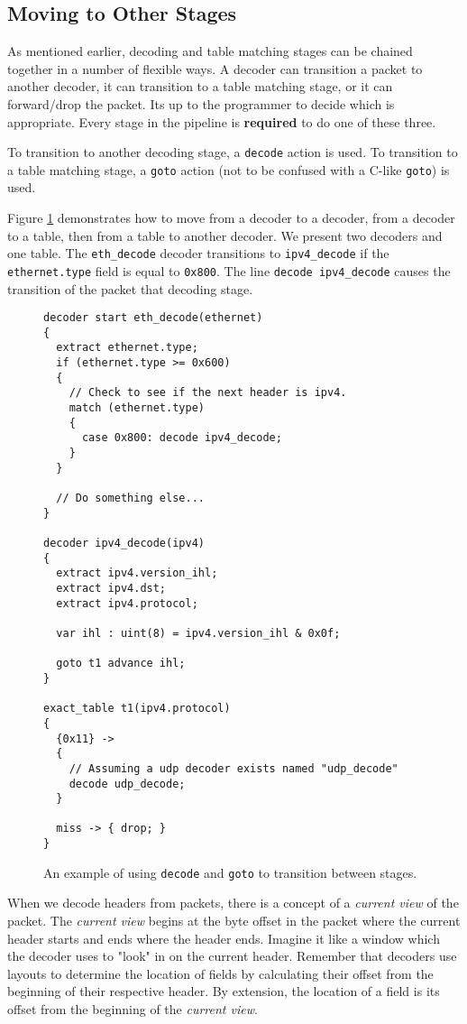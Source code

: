 \subsection{Moving to Other Stages} \label{decoder_next_tut}

As mentioned earlier, decoding and table matching stages can be chained together in a number of flexible ways. A decoder can transition a packet to another decoder, it can transition to a table matching stage, or it can forward/drop the packet. Its up to the programmer to decide which is appropriate. Every stage in the pipeline is \textbf{required} to do one of these three.

To transition to another decoding stage, a \texttt{decode} action is used. To transition to a table matching stage, a \texttt{goto} action (not to be confused with a C-like \texttt{goto}) is used. 

Figure \ref{fg:transition_ex} demonstrates how to move from a decoder to a decoder, from a decoder to a table, then from a table to another decoder. We present two decoders and one table. The \texttt{eth\_decode} decoder transitions to \texttt{ipv4\_decode} if the \texttt{ethernet.type} field is equal to \texttt{0x800}. The line \texttt{decode ipv4\_decode} causes the transition of the packet that decoding stage.

\begin{figure}
\begin{lstlisting}
decoder start eth_decode(ethernet)
{
  extract ethernet.type;
  if (ethernet.type >= 0x600) 
  {
  	// Check to see if the next header is ipv4.
    match (ethernet.type)
    {
      case 0x800: decode ipv4_decode;
    }
  }
  
  // Do something else...
}

decoder ipv4_decode(ipv4)
{
  extract ipv4.version_ihl;
  extract ipv4.dst;
  extract ipv4.protocol;
  
  var ihl : uint(8) = ipv4.version_ihl & 0x0f;
  
  goto t1 advance ihl;
}

exact_table t1(ipv4.protocol)
{
  {0x11} ->
  {
    // Assuming a udp decoder exists named "udp_decode"
    decode udp_decode;
  }
  
  miss -> { drop; }
}
\end{lstlisting}
\caption{An example of using \texttt{decode} and \texttt{goto} to transition between stages.}
\label{fg:transition_ex}
\end{figure}

When we decode headers from packets, there is a concept of a \textit{current view} of the packet. The \textit{current view} begins at the byte offset in the packet where the current header starts and ends where the header ends. Imagine it like a window which the decoder uses to "look" in on the current header. Remember that decoders use layouts to determine the location of fields by calculating their offset from the beginning of their respective header. By extension, the location of a field is its offset from the beginning of the \textit{current view}. 

